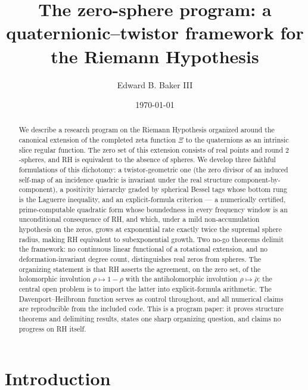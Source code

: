 \documentclass[11pt]{amsart}
\theoremstyle{plain}
\theoremstyle{definition}
\theoremstyle{remark}
\begin{document}
\title[The zero-sphere program]{The zero-sphere program: a quaternionic--twistor framework for the Riemann Hypothesis}

\author{Edward B. Baker III}

\date{\today}

\begin{abstract}
We describe a research program on the Riemann Hypothesis organized around the canonical extension of
the completed zeta function $\Xi$ to the quaternions as an intrinsic slice regular function. The zero
set of this extension consists of real points and round $2$-spheres, and RH is equivalent to the
absence of spheres. We develop three faithful formulations of this dichotomy: a twistor-geometric one
(the zero divisor of an induced self-map of an incidence quadric is invariant under the real structure
component-by-component), a positivity hierarchy graded by spherical Bessel tags whose bottom rung is
the Laguerre inequality, and an explicit-formula criterion --- a numerically certified,
prime-computable quadratic form whose boundedness in every frequency window is an unconditional
consequence of RH, and which, under a mild non-accumulation hypothesis on the zeros, grows at
exponential rate exactly twice the supremal sphere radius, making RH equivalent to
subexponential growth. Two no-go theorems delimit the
framework: no continuous linear functional of a rotational extension, and no deformation-invariant
degree count, distinguishes real zeros from spheres. The organizing statement is that RH asserts the
agreement, on the zero set, of the holomorphic involution $\rho\mapsto 1-\rho$ with the
antiholomorphic involution $\rho\mapsto\bar\rho$; the central open problem is to import the latter
into explicit-formula arithmetic. The Davenport--Heilbronn function serves as control throughout, and
all numerical claims are reproducible from the included code. This is a program paper: it proves
structure theorems and delimiting results, states one sharp organizing question, and claims no
progress on RH itself.
\end{abstract}

\maketitle
\tableofcontents

\section{Introduction}\label{sec:intro}
\end{document}
